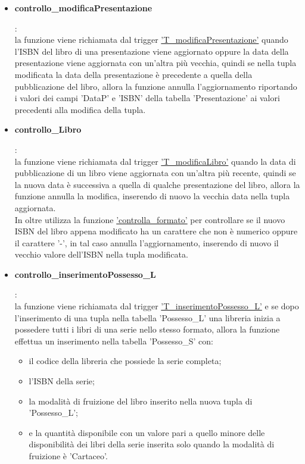 \documentclass{article}
\begin{document}
\begin{itemize}
    \item \hypertarget{f16}{\textbf{controllo\_modificaPresentazione}}:\\
    la funzione viene richiamata dal trigger \hyperlink{t16}{'T\_modificaPresentazione'} quando l'ISBN del libro di una presentazione viene aggiornato oppure la data della presentazione viene aggiornata con un'altra più vecchia, quindi se nella tupla modificata la data della presentazione è precedente a quella della pubblicazione del libro, allora la funzione annulla l'aggiornamento riportando i valori dei campi 'DataP' e 'ISBN' della tabella 'Presentazione' ai valori precedenti alla modifica della tupla.

    \item \hypertarget{f17}{\textbf{controllo\_Libro}}:\\
    la funzione viene richiamata dal trigger \hyperlink{t17}{'T\_modificaLibro'} quando la data di pubblicazione di un libro viene aggiornata con un'altra più recente, quindi se la nuova data è successiva a quella di qualche presentazione del libro, allora la funzione annulla la modifica, inserendo di nuovo la vecchia data nella tupla aggiornata.\\
    In oltre utilizza la funzione \hyperlink{f24}{'controlla\_formato'} per controllare se il nuovo ISBN del libro appena modificato ha un carattere che non è numerico oppure il carattere '-', in tal caso annulla l'aggiornamento, inserendo di nuovo il vecchio valore dell'ISBN nella tupla modificata. 

    \item \hypertarget{f18}{\textbf{controllo\_inserimentoPossesso\_L}}:\\
    la funzione viene richiamata dal trigger \hyperlink{t18}{'T\_inserimentoPossesso\_L'} e se dopo l'inserimento di una tupla nella tabella 'Possesso\_L' una libreria inizia a possedere tutti i libri di una serie nello stesso formato, allora la funzione effettua un inserimento nella tabella 'Possesso\_S' con: 
    \begin{itemize}
        \item il codice della libreria che possiede la serie completa;
        \item l'ISBN della serie;
        \item la modalità di fruizione del libro inserito nella nuova tupla di 'Possesso\_L';
        \item e la quantità disponibile con un valore pari a quello minore delle disponibilità dei libri della serie inserita solo quando la modalità di fruizione è 'Cartaceo'.
    \end{itemize}    


\end{itemize}
\end{document}
